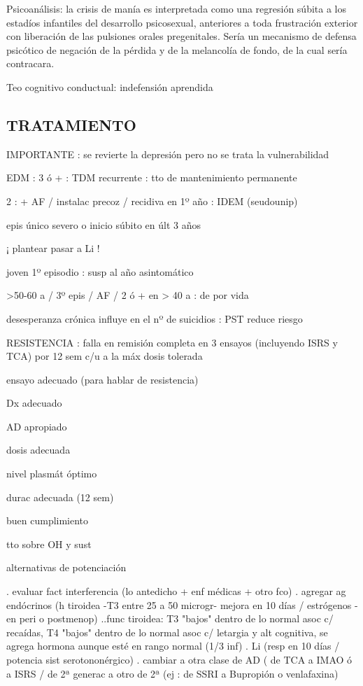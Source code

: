 \documentclass{scrbook}
\begin{document}
Psicoanálisis: la crisis de manía es interpretada como una regresión súbita a los estadíos infantiles del desarrollo psicosexual, anteriores a toda frustración exterior con liberación de las pulsiones orales pregenitales. Sería un mecanismo de defensa psicótico de negación de la pérdida y de la melancolía de fondo, de la cual sería contracara.

Teo cognitivo conductual: indefensión aprendida

\subsection*{TRATAMIENTO}

IMPORTANTE : se revierte la depresión pero no se trata la vulnerabilidad

EDM : 3 ó + : TDM recurrente : tto de mantenimiento permanente

2 : + AF / instalac precoz / recidiva en 1º año : IDEM (seudounip)

epis único severo o inicio súbito en últ 3 años

¡ plantear pasar a Li !

joven 1º episodio : susp al año asintomático

>50-60 a / 3º epis / AF / 2 ó + en > 40 a : de por vida

desesperanza crónica influye en el nº de suicidios : PST reduce riesgo

RESISTENCIA : falla en remisión completa en 3 ensayos (incluyendo ISRS y TCA) por 12 sem c/u a la máx dosis tolerada

ensayo adecuado (para hablar de resistencia)

Dx adecuado

AD apropiado

dosis adecuada

nivel plasmát óptimo

durac adecuada (12 sem)

buen cumplimiento

tto sobre OH y sust

alternativas de potenciación

. evaluar fact interferencia (lo antedicho + enf médicas + otro fco)
. agregar ag endócrinos (h tiroidea -T3 entre 25 a 50 microgr- mejora en 10 días / estrógenos - en peri o postmenop)
..func tiroidea: T3 "bajos" dentro de lo normal asoc c/ recaídas, T4 "bajos" dentro de lo normal asoc c/ letargia y alt cognitiva, se agrega hormona aunque esté en rango normal (1/3 inf)
. Li (resp en 10 días / potencia sist serotononérgico)
. cambiar a otra clase de AD ( de TCA a IMAO ó a ISRS / de 2ª generac a otro de 2ª (ej : de SSRI a Bupropión o venlafaxina)
\end{document}
